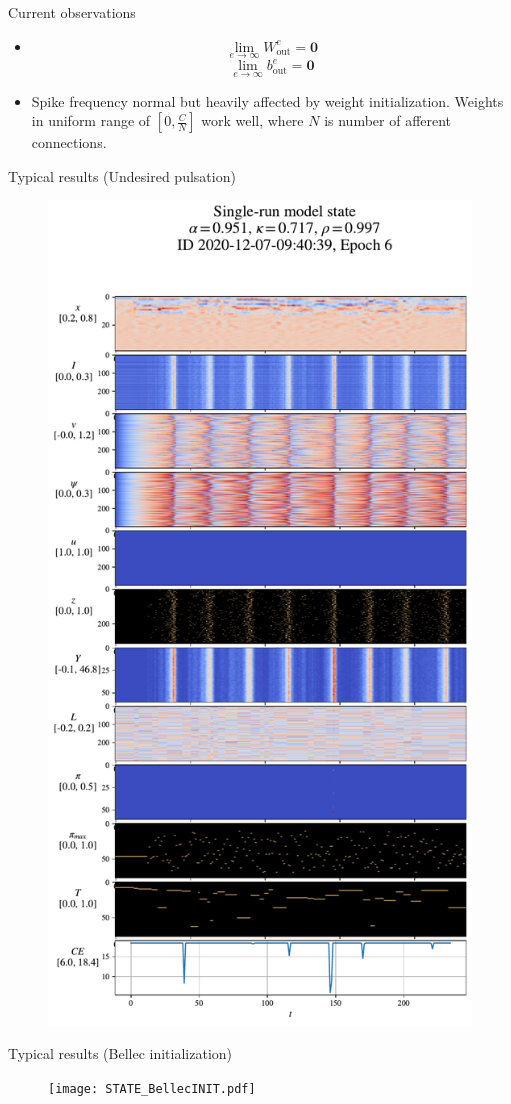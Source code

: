 \documentclass[t]{beamer}
\begin{document}
\begin{frame}{Current observations}

\begin{itemize}[label=--]
\item \[\lim_{e\to\infty} W^e_{\textrm{out}} = \mathbf{0}\]
\[\lim_{e\to\infty} b^e_{\textrm{out}} = \mathbf{0}\]
\item Spike frequency normal but heavily affected by weight initialization. Weights in uniform range of $[0, \frac{C}{N}]$ work well, where $N$ is number of afferent connections.
\end{itemize}

\end{frame}

\begin{frame}{Typical results (Undesired pulsation)}

	\begin{figure}[!ht]
		\includegraphics[clip, trim=0cm 0cm 0cm 4.2cm, width=0.33\linewidth]{STATE_pulsating.pdf}  %
	\end{figure}

\end{frame}

\begin{frame}{Typical results (Bellec initialization)}

	\begin{figure}[!ht]
		\texttt{[image: STATE\_BellecINIT.pdf]}  %
	\end{figure}

\end{frame}
\end{document}
